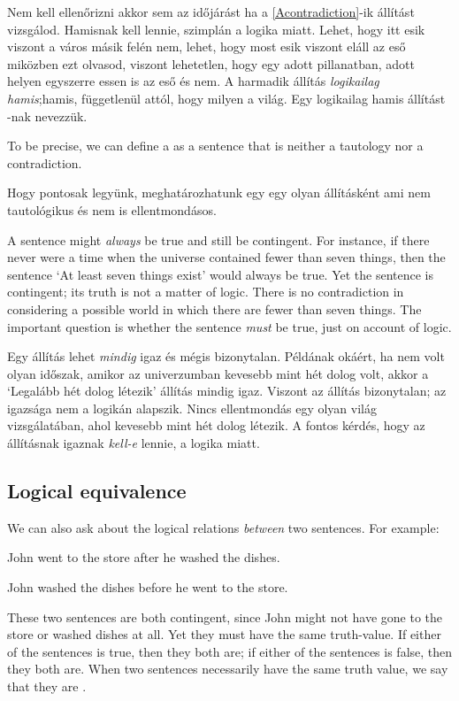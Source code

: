 Nem kell ellenőrizni akkor sem az időjárást ha a \ref{Acontradiction}-ik állítást vizsgálod. Hamisnak kell lennie, szimplán a logika miatt. Lehet, hogy itt esik viszont a város másik felén nem, lehet, hogy most esik viszont eláll az eső miközben ezt olvasod, viszont lehetetlen, hogy egy adott pillanatban, adott helyen egyszerre essen is az eső és nem. A harmadik állítás \emph{logikailag hamis};hamis, függetlenül attól, hogy milyen a világ. Egy logikailag hamis állítást -nak nevezzük.

To be precise, we can define a  as a sentence that is neither a tautology nor a contradiction.

Hogy pontosak legyünk, meghatározhatunk egy  egy olyan állításként ami nem tautológikus és nem is ellentmondásos.

A sentence might \emph{always} be true and still be contingent. For instance, if there never were a time when the universe contained fewer than seven things, then the sentence `At least seven things exist' would always be true. Yet the sentence is contingent; its truth is not a matter of logic. There is no contradiction in considering a possible world in which there are fewer than seven things. The important question is whether the sentence \emph{must} be true, just on account of logic.

Egy állítás lehet \emph{mindig} igaz és mégis bizonytalan. Példának okáért, ha nem volt olyan időszak, amikor az univerzumban kevesebb mint hét dolog volt, akkor a `Legalább hét dolog létezik' állítás mindig igaz. Viszont az állítás bizonytalan; az igazsága nem a logikán alapszik. Nincs ellentmondás egy olyan világ vizsgálatában, ahol kevesebb mint hét dolog létezik. A fontos kérdés, hogy az állításnak igaznak \emph{kell-e} lennie, a logika miatt.



\subsection{Logical equivalence}
We can also ask about the logical relations \emph{between} two sentences. For example:
\begin{earg}
\item[] John went to the store after he washed the dishes.
\item[] John washed the dishes before he went to the store.
\end{earg}
These two sentences are both contingent, since John might not have gone to the store or washed dishes at all. Yet they must have the same truth-value. If either of the sentences is true, then they both are; if either of the sentences is false, then they both are. When two sentences necessarily have the same truth value, we say that they are .


